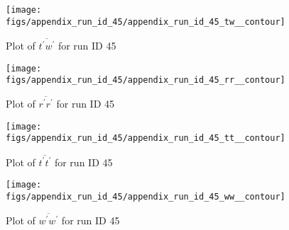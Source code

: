 \begin{figure}[H]
\centering
\texttt{[image: figs/appendix\_run\_id\_45/appendix\_run\_id\_45\_tw\_\_contour]}
\caption{Plot of $\overline{t^\prime w^\prime}$ for run ID 45}
\label{fig:appendix_run_id_45_tw__contour}
\end{figure}


\begin{figure}[H]
\centering
\texttt{[image: figs/appendix\_run\_id\_45/appendix\_run\_id\_45\_rr\_\_contour]}
\caption{Plot of $\overline{r^\prime r^\prime}$ for run ID 45}
\label{fig:appendix_run_id_45_rr__contour}
\end{figure}


\begin{figure}[H]
\centering
\texttt{[image: figs/appendix\_run\_id\_45/appendix\_run\_id\_45\_tt\_\_contour]}
\caption{Plot of $\overline{t^\prime t^\prime}$ for run ID 45}
\label{fig:appendix_run_id_45_tt__contour}
\end{figure}


\begin{figure}[H]
\centering
\texttt{[image: figs/appendix\_run\_id\_45/appendix\_run\_id\_45\_ww\_\_contour]}
\caption{Plot of $\overline{w^\prime w^\prime}$ for run ID 45}
\label{fig:appendix_run_id_45_ww__contour}
\end{figure}


